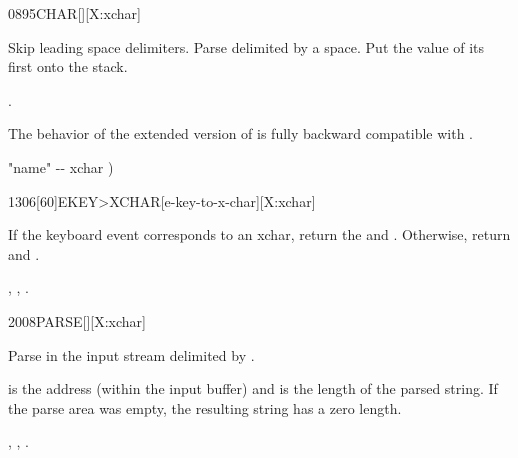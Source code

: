 \begin{worddef}{0895}{CHAR}[][X:xchar]
\item {}

	Skip leading space delimiters.  Parse  delimited by a space.
	Put the value of its first  onto the stack.

\see {}.

	\begin{rationale}
		The behavior of the extended version of  is fully backward
		compatible with .
	\end{rationale}

	\begin{implement}
	\word{:}   "name" -{}- xchar )
		      \word{;}
	\end{implement}
\end{worddef}


\vspace*{-0.75ex}
\begin{worddef}[EKEYtoXCHAR]{1306}[60]{EKEY>XCHAR}[e-key-to-x-char][X:xchar]
\item {}

	If the keyboard event  corresponds to an xchar, return the
	 and .  Otherwise, return  and
	.

\see {},
	,
	.
\end{worddef}


\vspace*{-0.75ex}
\begin{worddef}{2008}{PARSE}[][X:xchar]
\item {}

  Parse  in the input stream delimited by .

	 is the address (within the input buffer) and 
	is the length of the parsed string. If the parse area was empty, the
	resulting string has a zero length.

\see {},
	,
	.
\end{worddef}


